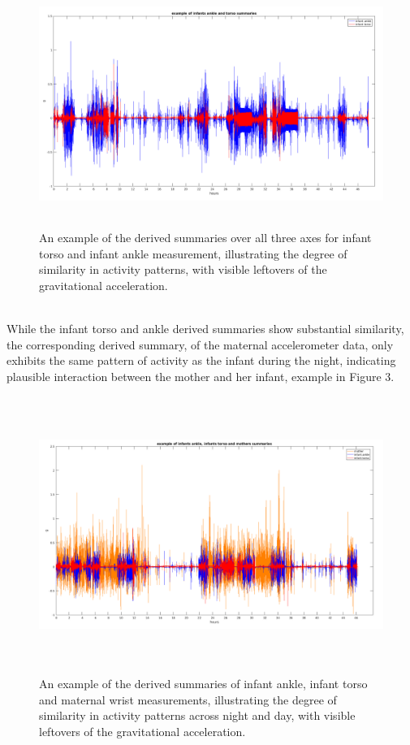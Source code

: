 \documentclass{article}
\begin{document}
{\begin{figure}[h]
\includegraphics[width=15cm, height=8cm]{exampleTorsoAnkle.png}
\caption{An example of the derived summaries over all three axes for infant torso and infant ankle measurement, illustrating the degree of similarity in activity patterns, with visible leftovers of the gravitational acceleration.}
\end{figure}
\\
While the infant torso and ankle derived summaries show substantial similarity, the corresponding derived summary, of the maternal accelerometer data, only exhibits the same pattern of activity as the infant during the night, indicating plausible interaction between the mother and her infant, example in Figure 3.\\
\begin{figure}[h]
\includegraphics[width=15cm, height=9cm]{exampleTorsoAnkle2.png}
\caption{An example of the derived summaries of infant ankle, infant torso and maternal wrist measurements, illustrating the degree of similarity in activity patterns across night and day, with visible leftovers of the gravitational acceleration.}
\end{figure}

}
\end{document}
